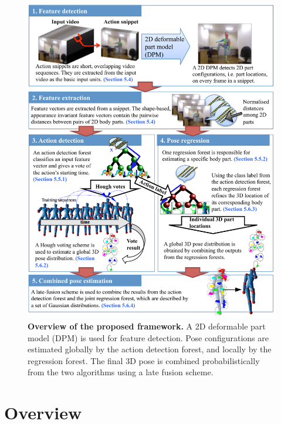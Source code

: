 \begin{figure}[!th]
	\centering
	\includegraphics[width=0.95\linewidth]{fig/body/body_overview.pdf}
	\caption{\textbf{Overview of the proposed framework.} A 2D deformable part model (DPM) is used for feature detection. Pose configurations are estimated globally by the action detection forest, and locally by the regression forest. The final 3D pose is combined probabilistically from the two algorithms using a late fusion scheme.}
	\label{fig/body/overview}
\end{figure} 

\section{Overview}
\label{sec/body/method}

